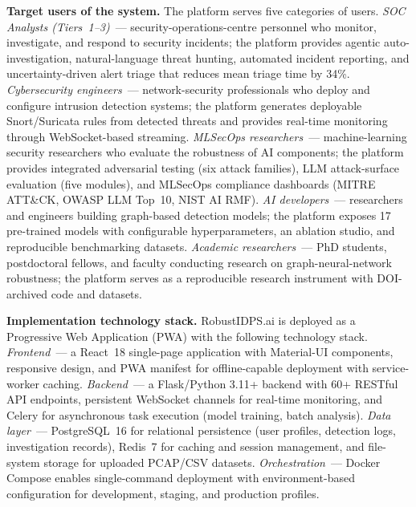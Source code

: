 \noindent\textbf{Target users of the system.} The platform
serves five categories of users. \emph{SOC Analysts (Tiers~1--3)}~---
security-operations-centre personnel who monitor, investigate, and
respond to security incidents; the platform provides agentic
auto-investigation, natural-language threat hunting, automated
incident reporting, and uncertainty-driven alert triage that
reduces mean triage time by 34\%. \emph{Cybersecurity engineers}~---
network-security professionals who deploy and configure intrusion
detection systems; the platform generates deployable Snort/Suricata
rules from detected threats and provides real-time monitoring
through WebSocket-based streaming. \emph{MLSecOps researchers}~---
machine-learning security researchers who evaluate the robustness
of AI components; the platform provides integrated adversarial
testing (six attack families), LLM attack-surface evaluation
(five modules), and MLSecOps compliance dashboards (MITRE ATT\&CK,
OWASP LLM Top~10, NIST AI RMF). \emph{AI developers}~---
researchers and engineers building graph-based detection models;
the platform exposes 17 pre-trained models with configurable
hyperparameters, an ablation studio, and reproducible benchmarking
datasets. \emph{Academic researchers}~--- PhD students,
postdoctoral fellows, and faculty conducting research on
graph-neural-network robustness; the platform serves as a
reproducible research instrument with DOI-archived code and
datasets.

\noindent\textbf{Implementation technology stack.}
RobustIDPS.ai is deployed as a Progressive Web Application (PWA)
with the following technology stack. \emph{Frontend}~--- a
React~18 single-page application with Material-UI components,
responsive design, and PWA manifest for offline-capable deployment
with service-worker caching. \emph{Backend}~--- a Flask/Python
3.11+ backend with 60+ RESTful API endpoints, persistent WebSocket
channels for real-time monitoring, and Celery for asynchronous
task execution (model training, batch analysis). \emph{Data
layer}~--- PostgreSQL~16 for relational persistence (user
profiles, detection logs, investigation records), Redis~7 for
caching and session management, and file-system storage for
uploaded PCAP/CSV datasets. \emph{Orchestration}~--- Docker
Compose enables single-command deployment with environment-based
configuration for development, staging, and production profiles.

